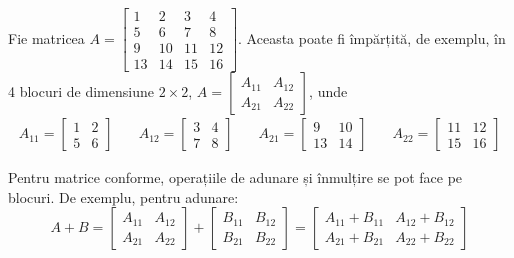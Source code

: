 \documentclass{exam}
\begin{document}
Fie matricea $A = \begin{bmatrix} 1 & 2 & 3 & 4 \\ 5 & 6 & 7 & 8 \\ 9 & 10 & 11 & 12 \\ 13 & 14 & 15 & 16\end{bmatrix}$.
Aceasta poate fi împărțită, de exemplu, în 4 blocuri de dimensiune $2 \times 2$,
$A = \begin{bmatrix} A_{11} & A_{12} \\ A_{21} & A_{22} \end{bmatrix}$, unde
\begin{equation*}
	\begin{split}
		A_{11} = \begin{bmatrix} 1 & 2 \\ 5 & 6 \end{bmatrix}
	\end{split}
	\quad
	\begin{split}
		A_{12} = \begin{bmatrix} 3 & 4 \\ 7 & 8 \end{bmatrix}
	\end{split}
	\quad
	\begin{split}
		A_{21} = \begin{bmatrix} 9 & 10 \\ 13 & 14 \end{bmatrix}
	\end{split}
	\quad
	\begin{split}
		A_{22}  = \begin{bmatrix} 11 & 12 \\ 15 & 16 \end{bmatrix}
	\end{split}
\end{equation*}

Pentru matrice conforme, operațiile de adunare și înmulțire se pot face pe
blocuri. De exemplu, pentru adunare:
\begin{equation*}
	A + B = \begin{bmatrix} A_{11} & A_{12} \\ A_{21} & A_{22} \end{bmatrix} + \begin{bmatrix} B_{11} & B_{12} \\ B_{21} & B_{22} \end{bmatrix} = \begin{bmatrix} A_{11} + B_{11} & A_{12} + B_{12} \\ A_{21} + B_{21} & A_{22} + B_{22} \end{bmatrix}
\end{equation*}
\end{document}
